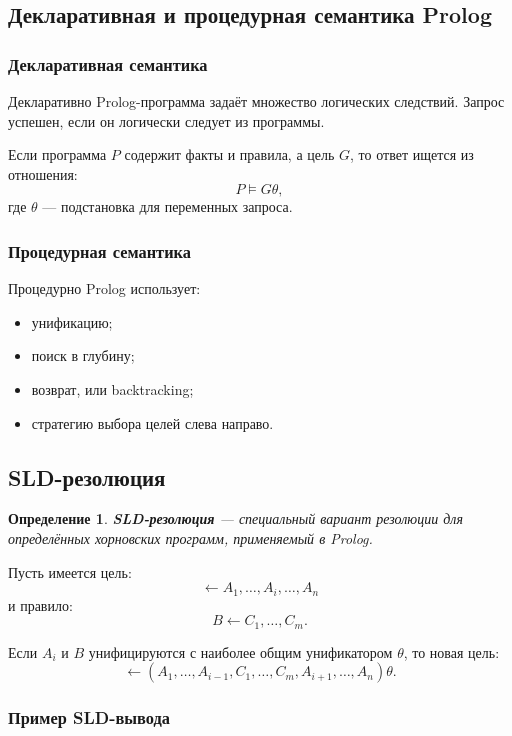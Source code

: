 \documentclass[12pt,a4paper]{article}
\newtheorem{definition}{Определение}
\begin{document}
\subsection{Декларативная и процедурная семантика Prolog}

\subsubsection{Декларативная семантика}

Декларативно Prolog-программа задаёт множество логических следствий. Запрос успешен, если он логически следует из программы.

Если программа $P$ содержит факты и правила, а цель $G$, то ответ ищется из отношения:
$$
P \models G\theta,
$$
где $\theta$ --- подстановка для переменных запроса.

\subsubsection{Процедурная семантика}

Процедурно Prolog использует:
\begin{itemize}
    \item унификацию;
    \item поиск в глубину;
    \item возврат, или backtracking;
    \item стратегию выбора целей слева направо.
\end{itemize}

\subsection{SLD-резолюция}

\begin{definition}
\textbf{SLD-резолюция} --- специальный вариант резолюции для определённых хорновских программ, применяемый в Prolog.
\end{definition}

Пусть имеется цель:
$$
\leftarrow A_1,\dots,A_i,\dots,A_n
$$
и правило:
$$
B \leftarrow C_1,\dots,C_m.
$$

Если $A_i$ и $B$ унифицируются с наиболее общим унификатором $\theta$, то новая цель:
$$
\leftarrow (A_1,\dots,A_{i-1},C_1,\dots,C_m,A_{i+1},\dots,A_n)\theta.
$$

\subsubsection{Пример SLD-вывода}
\end{document}
